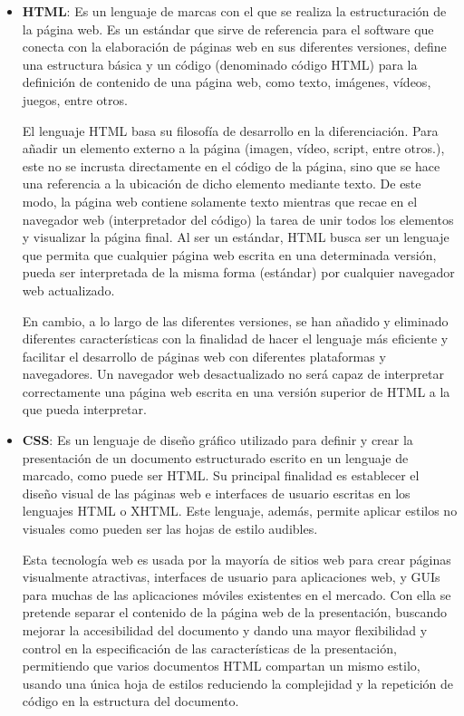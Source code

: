 \begin{itemize}
\item \textbf{HTML}: Es un lenguaje de marcas con el que se realiza la estructuración de la página web. Es un estándar que sirve de referencia para el software que conecta con la elaboración de páginas web en sus diferentes versiones, define una estructura básica y un código (denominado código HTML) para la definición de contenido de una página web, como texto, imágenes, vídeos, juegos, entre otros. 

El lenguaje HTML basa su filosofía de desarrollo en la diferenciación. Para añadir un elemento externo a la página (imagen, vídeo, script, entre otros.), este no se incrusta directamente en el código de la página, sino que se hace una referencia a la ubicación de dicho elemento mediante texto. De este modo, la página web contiene solamente texto mientras que recae en el navegador web (interpretador del código) la tarea de unir todos los elementos y visualizar la página final. Al ser un estándar, HTML busca ser un lenguaje que permita que cualquier página web escrita en una determinada versión, pueda ser interpretada de la misma forma (estándar) por cualquier navegador web actualizado.

En cambio, a lo largo de las diferentes versiones, se han añadido y eliminado diferentes características con la finalidad de hacer el lenguaje más eficiente y facilitar el desarrollo de páginas web con diferentes plataformas y navegadores. Un navegador web  desactualizado no será capaz de interpretar correctamente una página web escrita en una versión superior de HTML a la que pueda interpretar.  

\item \textbf{CSS}: Es un lenguaje de diseño gráfico utilizado para definir y crear la presentación de un documento estructurado escrito en un lenguaje de marcado, como puede ser HTML. Su principal finalidad es establecer el diseño visual de las páginas web e interfaces de usuario escritas en los lenguajes HTML o XHTML. Este lenguaje, además, permite aplicar estilos no visuales como pueden ser las hojas de estilo audibles.

Esta tecnología web es usada por la mayoría de sitios web para crear páginas visualmente atractivas, interfaces de usuario para aplicaciones web, y GUIs para muchas de las aplicaciones móviles existentes en el mercado. Con ella se pretende separar el contenido de la página web de la presentación, buscando mejorar la accesibilidad del documento y dando una mayor flexibilidad y control en la especificación de las características de la presentación, permitiendo que varios documentos HTML compartan un mismo estilo, usando una única hoja de estilos reduciendo la complejidad y la repetición de código en la estructura del documento.


\end{itemize}

